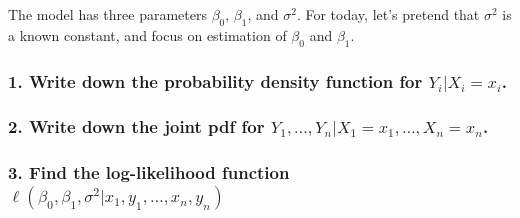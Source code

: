 \documentclass[]{article}
\begin{document}
The model has three parameters \(\beta_0\), \(\beta_1\), and
\(\sigma^2\). For today, let's pretend that \(\sigma^2\) is a known
constant, and focus on estimation of \(\beta_0\) and \(\beta_1\).

\subsubsection{\texorpdfstring{1. Write down the probability density
function for
\(Y_i | X_i = x_i\).}{1. Write down the probability density function for Y\_i \textbar{} X\_i = x\_i.}}\label{write-down-the-probability-density-function-for-y_i-x_i-x_i.}

\vspace{5cm}

\subsubsection{\texorpdfstring{2. Write down the joint pdf for
\(Y_1, \ldots, Y_n | X_{1} = x_1, \ldots, X_{n} = x_{n}\).}{2. Write down the joint pdf for Y\_1, \textbackslash{}ldots, Y\_n \textbar{} X\_\{1\} = x\_1, \textbackslash{}ldots, X\_\{n\} = x\_\{n\}.}}\label{write-down-the-joint-pdf-for-y_1-ldots-y_n-x_1-x_1-ldots-x_n-x_n.}

\vspace{9cm}

\subsubsection{\texorpdfstring{3. Find the log-likelihood function
\(\ell(\beta_0, \beta_1, \sigma^2 | x_1, y_1, \ldots, x_n, y_n)\)}{3. Find the log-likelihood function \textbackslash{}ell(\textbackslash{}beta\_0, \textbackslash{}beta\_1, \textbackslash{}sigma\^{}2 \textbar{} x\_1, y\_1, \textbackslash{}ldots, x\_n, y\_n)}}\label{find-the-log-likelihood-function-ellbeta_0-beta_1-sigma2-x_1-y_1-ldots-x_n-y_n}

\newpage
\end{document}
